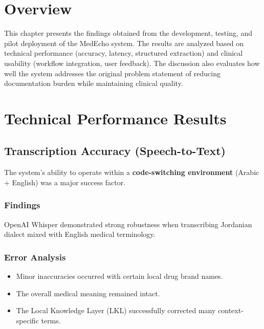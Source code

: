 


\section{Overview}
\label{sec:results:overview}
This chapter presents the findings obtained from the development, testing, and pilot 
deployment of the MedEcho system. The results are analyzed based on technical performance 
(accuracy, latency, structured extraction) and clinical usability (workflow integration, 
user feedback). The discussion also evaluates how well the system addresses the original 
problem statement of reducing documentation burden while maintaining clinical quality.

\section{Technical Performance Results}

\subsection{Transcription Accuracy (Speech-to-Text)}
\label{sec:results:accuracy}

The system’s ability to operate within a \textbf{code-switching environment} 
(Arabic + English) was a major success factor.

\subsubsection*{Findings}
OpenAI Whisper demonstrated strong robustness when transcribing Jordanian dialect 
mixed with English medical terminology.

\subsubsection*{Error Analysis}
\begin{itemize}
    \item Minor inaccuracies occurred with certain local drug brand names.
    \item The overall medical meaning remained intact.
    \item The Local Knowledge Layer (LKL) successfully corrected many context-specific terms.
\end{itemize}

